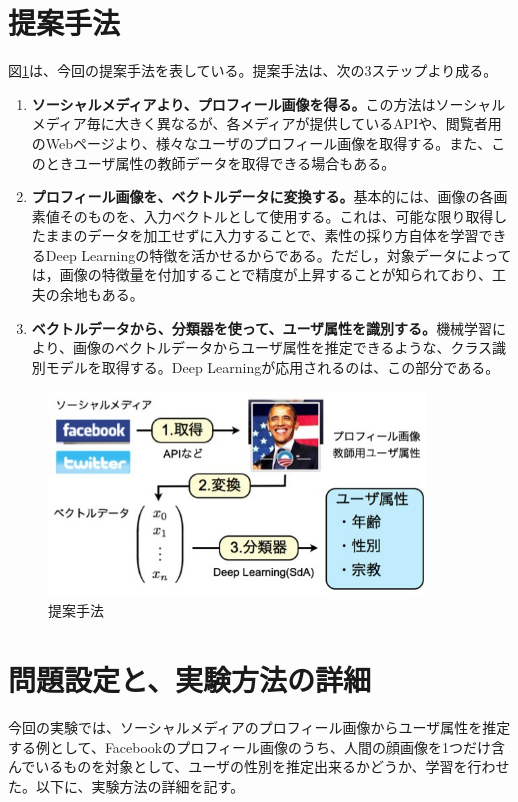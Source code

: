 \section{提案手法}
図\ref{c7_proposal}は、今回の提案手法を表している。提案手法は、次の3ステップより成る。
\begin{enumerate}
\item \textbf{ソーシャルメディアより、プロフィール画像を得る。}この方法はソーシャルメディア毎に大きく異なるが、各メディアが提供しているAPIや、閲覧者用のWebページより、様々なユーザのプロフィール画像を取得する。また、このときユーザ属性の教師データを取得できる場合もある。
\item \textbf{プロフィール画像を、ベクトルデータに変換する。}基本的には、画像の各画素値そのものを、入力ベクトルとして使用する。これは、可能な限り取得したままのデータを加工せずに入力することで、素性の採り方自体を学習できるDeep Learningの特徴を活かせるからである。ただし，対象データによっては，画像の特徴量を付加することで精度が上昇する\cite{ciresan2012multi-column}ことが知られており、工夫の余地もある。
\item \textbf{ベクトルデータから、分類器を使って、ユーザ属性を識別する。}機械学習により、画像のベクトルデータからユーザ属性を推定できるような、クラス識別モデルを取得する。Deep Learningが応用されるのは、この部分である。
\end{enumerate}


\begin{figure}[tbp]
 \begin{center}
  \includegraphics[width=100mm]{img/c7/proposal}
 \end{center}
 \caption{提案手法}
 \label{c7_proposal}
\end{figure}

\section{問題設定と、実験方法の詳細}
今回の実験では、ソーシャルメディアのプロフィール画像からユーザ属性を推定する例として、Facebookのプロフィール画像のうち、人間の顔画像を1つだけ含んでいるものを対象として、ユーザの性別を推定出来るかどうか、学習を行わせた。以下に、実験方法の詳細を記す。
